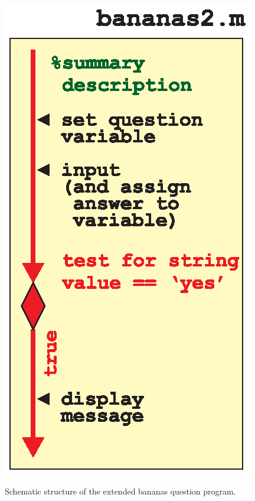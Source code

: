 \documentclass{tufte-book} %
\begin{document}
\begin{marginfigure}[0.0in]
\includegraphics[width=\linewidth]{ch2-bananas2.eps}
\caption{Schematic structure of the extended bananas question program.}
\label{fig:ch2-bananas2}
\end{marginfigure}
\end{document}
